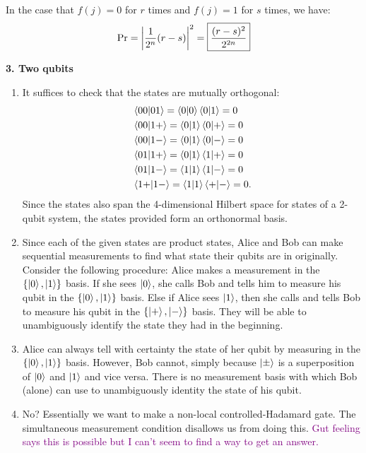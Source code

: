 \documentclass{article}
\theoremstyle{definition}
\newcommand{\f}[2]{\frac{#1}{#2}}
\begin{document}
In the case that $f(j) = 0$ for $r$ times and $f(j)=1$ for $s$ times, we have:
\begin{align*}
	\Pr = \abs{\f{1}{2^n} (r-s)   }^2 = \boxed{\f{(r-s)^2}{2^{2n}}}
\end{align*}

\newpage

\noindent \textbf{3. Two qubits}

\begin{enumerate}[label=(\alph*)]
	\item It suffices to check that the states are mutually orthogonal:
	\begin{align*}
		&\bra{00}\ket{01} = \braket{0}\bra{0}\ket{1} = 0\\
		&\bra{00}\ket{1+} = \bra{0}\ket{1}\bra{0}\ket{+} = 0 \\
		&\bra{00}\ket{1-} = \bra{0}\ket{1}\bra{0}\ket{-} = 0\\
		&\bra{01}\ket{1+} = \bra{0}\ket{1}\bra{1}\ket{+} = 0 \\
		&\bra{01}\ket{1-} = \bra{1}\ket{1}\bra{1}\ket{-} = 0\\
		&\bra{1+}\ket{1-} = \bra{1}\ket{1}\bra{+}\ket{-} =0. 
	\end{align*}
	Since the states also span the 4-dimensional Hilbert space for states of a 2-qubit system, the states provided form an orthonormal basis. 
	
	\item Since each of the given states are product states, Alice and Bob can make sequential measurements to find what state their qubits are in originally. Consider the following procedure: Alice makes a measurement in the $\{\ket{0},\ket{1}\}$ basis. If she sees $\ket{0}$, she calls Bob and tells him to measure his qubit in the $\{\ket{0}, \ket{1}\}$ basis. Else if Alice sees $\ket{1}$, then she calls and tells Bob to measure his qubit in the $\{ \ket{+}, \ket{-}  \}$ basis. They will be able to unambiguously identify the state they had in the beginning.
	
	\item Alice can always tell with certainty the state of her qubit by measuring in the $\{  \ket{0},\ket{1} \}$ basis. However, Bob cannot, simply because $\ket{\pm}$ is a superposition of $\ket{0}$ and $\ket{1}$ and vice versa. There is no measurement basis with which Bob (alone) can use to unambiguously identity the state of his qubit.  
	
	\item No? Essentially we want to make a non-local controlled-Hadamard gate. The simultaneous measurement condition disallows us from doing this. \textcolor{purple}{Gut feeling says this is possible but I can't seem to find a way to get an answer.}
\end{enumerate}
\end{document}
